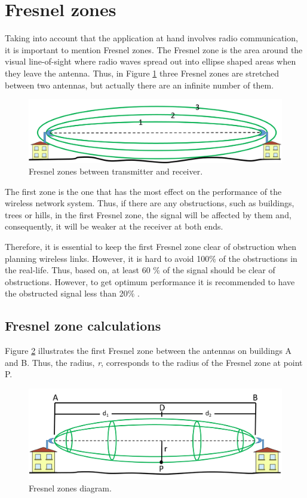 \section{Fresnel zones}\label{sec:fresnel}
Taking into account that the application at hand involves radio communication, it is important to mention Fresnel zones. The Fresnel zone is the area around the visual line-of-sight where radio waves spread out into ellipse shaped areas when they leave the antenna. Thus, in Figure \ref{fig:3fresnel_zones} three Fresnel zones are stretched between two antennas, but actually there are an infinite number of them.

\begin{figure}[H]
	\centering
	\includegraphics[scale=0.65]{figures/fresnel_zones.png}
	\caption{Fresnel zones between transmitter and receiver.}
	\label{fig:3fresnel_zones}
\end{figure}

The first zone is the one that has the most effect on the performance of the wireless network system. Thus, if there are any obstructions, such as buildings, trees or hills, in the first Fresnel zone, the signal will be affected by them and, consequently, it will be weaker at the receiver at both ends.

Therefore, it is essential to keep the first Fresnel zone clear of obstruction when planning wireless links. However, it is hard to avoid 100$\%$ of the obstructions in the real-life. Thus, based on, at least 60 $\%$ of the signal should be clear of obstructions. However, to get optimum performance it is recommended to have the obstructed signal less than 20$\%$ \cite{proxim}\cite{fresnelWiki}.

\subsection*{Fresnel zone calculations}
Figure \ref{fig:fresnel_zones} illustrates the first Fresnel zone between the antennas on buildings A and B. Thus, the radius, \textit{r}, corresponds to the radius of the Fresnel zone at point P. 

\begin{figure}[H]
	\centering
	\includegraphics[scale=0.60]{figures/fresnel_zone.png}
	\caption{Fresnel zones diagram.}
	\label{fig:fresnel_zones}
\end{figure} 

